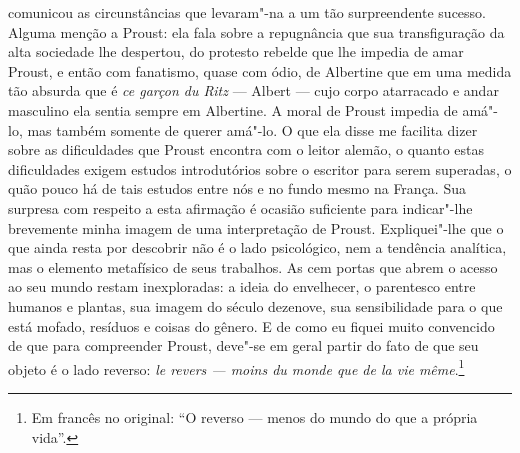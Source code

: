comunicou as circunstâncias que levaram"-na a um tão surpreendente
sucesso. Alguma menção a Proust: ela fala sobre a repugnância que sua
transfiguração da alta sociedade lhe despertou, do protesto rebelde que
lhe impedia de amar Proust, e então com fanatismo, quase com ódio, de
Albertine que em uma medida tão absurda que é \emph{ce garçon du Ritz}
--- Albert --- cujo corpo atarracado e andar masculino ela sentia sempre
em Albertine. A moral de Proust impedia de amá"-lo, mas também somente de
querer amá"-lo. O que ela disse me facilita dizer sobre as dificuldades
que Proust encontra com o leitor alemão, o quanto estas dificuldades
exigem estudos introdutórios sobre o escritor para serem superadas, o
quão pouco há de tais estudos entre nós e no fundo mesmo na França. Sua
surpresa com respeito a esta afirmação é ocasião suficiente para
indicar"-lhe brevemente minha imagem de uma interpretação de Proust.
Expliquei"-lhe que o que ainda resta por descobrir não é o lado
psicológico, nem a tendência analítica, mas o elemento metafísico de
seus trabalhos. As cem portas que abrem o acesso ao seu mundo restam
inexploradas: a ideia do envelhecer, o parentesco entre humanos e
plantas, sua imagem do século dezenove, sua sensibilidade para o que
está mofado, resíduos e coisas do gênero. E de como eu fiquei muito
convencido de que para compreender Proust, deve"-se em geral partir do
fato de que seu objeto é o lado reverso: \emph{le revers --- moins du
monde que de la vie même}.\footnote{Em francês no original: ``O reverso --- menos do mundo do
  que a própria vida''. \versal{[N. T.]}}

